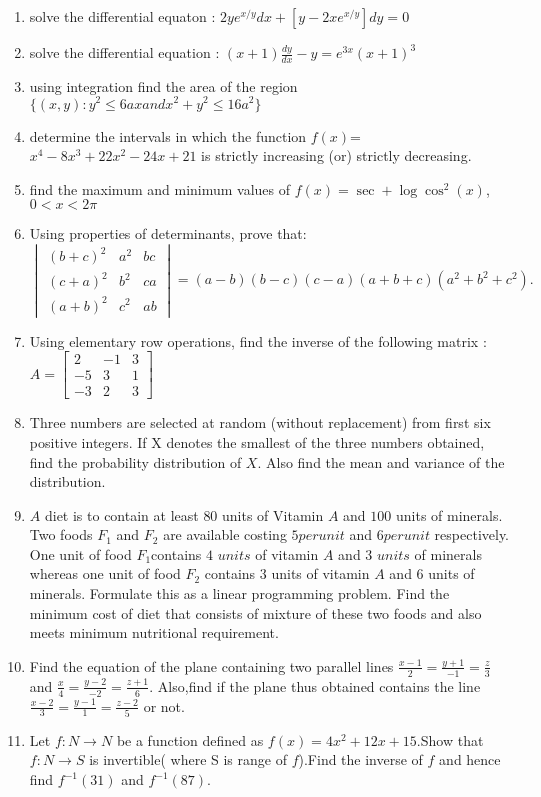 \documentclass[12pt,-letter paper]{article}
\providecommand{\mydet}[1]{\ensuremath{\begin{vmatrix}#1\end{vmatrix}}}
\providecommand{\myvec}[1]{\ensuremath{\begin{bmatrix}#1\end{bmatrix}}}
\begin{document}
\begin{enumerate}
\item solve the differential equaton : $2ye^{x/y}dx+[y-2xe^{x/y}]dy=0$
\item solve the differential equation : $(x+1)\frac{dy}{dx}-y=e^{3x}(x+1)^3$
\item using integration find the area of the region $\{(x,y):y^2 \leq 6 ax and x^2+y^2 \leq 16a^2\}$	
\item determine the intervals in which the function $f(x)$=$x^4-8x^3+22x^2-24x+21$ is strictly increasing (or) strictly decreasing.
\item find the maximum and minimum values of $f(x) =\sec+\log\cos^2(x)$,$0<x<2\pi$
\item Using properties of determinants, prove that: 
$\mydet{ 
(b+c)^2 & a^2 & bc \\ 
(c+a)^2 & b^2 & ca \\ 
(a+b)^2 & c^2 & ab } = (a-b)(b-c)(c-a)(a+b+c)(a^2+b^2+c^2).
$
\item Using elementary row operations, find the inverse of the following matrix : $A= \myvec{2&-1&3\\-5&3&1\\-3&2&3}$
\item Three numbers are selected at random (without replacement) from first six positive integers. If X denotes the smallest of the three numbers obtained, find the probability distribution of $X$. Also find the mean and variance of the distribution.
\item $A$ diet is to contain at least $80$ units of Vitamin $A$ and $
100$ units of minerals. Two foods $F_1$ and $F_2$ are available costing \rupee$5 per unit$ and \rupee$6 per unit$ respectively. One unit of food $F_1$contains $4$ $units$ of vitamin $A$ and $3$ $units$ of minerals whereas one unit of food $F_2$ contains $3$ units of vitamin $A$ and $6$ units of minerals. Formulate this as a linear programming problem. Find the minimum cost of diet that consists of mixture of these two foods and also meets minimum nutritional requirement.
\item  Find the equation of the plane containing two parallel lines  $\frac{x-1}{2}=\frac{y+1}{-1}=\frac{z}{3}$ and $\frac{x}{4}=\frac{y-2}{-2}=\frac{z+1}{6}.$ Also,find if the plane thus obtained contains  the line $\frac{x-2}{3}=\frac{y-1}{1}=\frac{z-2}{5}$ or not.
\item Let $f : N \rightarrow N$ be a function defined as $f(x)= 4x^{   2}+12x+15$.Show that $f:N \rightarrow S$ is invertible( where S is range of $f$).Find the inverse of $f$ and hence find $f^{-1}(31)$ and $f^{-1}(87)$.
\end{enumerate}
\end{document}
